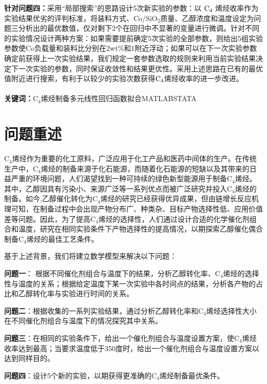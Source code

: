 \documentclass[a4paper,10.5pt]{ctexart}
\begin{document}
\par \textbf{针对问题四：}采用“局部搜索”的思路设计5次新实验的参数：以 ${\rm C}_4$ 烯烃收率作为实验结果优劣的评判标准，将装料方式、Co/SiO$_2$质量、乙醇浓度和温度设定为问题三分析出的最优数值，仅对剩下2个在回归中不显著的变量进行微调。针对不同的实验情况设计两种方案：如果需要提前确定5次实验的全部参数，则给出5组实验参数使Co负载量和装料比分别在2wt$\%$和1附近浮动；如果可以在下一次实验参数确定前获得上一次实验结果，我们规定一套参数选取的规则来利用当前实验结果决定下一次实验的参数，同时保证收敛性和结果更优性。采用上述思路在已有的最优值附近进行搜索，有利于以较少的实验次数获得${\rm C}_4$烯烃收率的进一步改进。\\
~\\
\textbf{关键词：}C$_4$烯烃制备\quad 多元线性回归\quad 函数拟合\quad MATLAB\quad STATA
\clearpage

\section{问题重述}
\par C$_4$烯烃作为重要的化工原料，广泛应用于化工产品和医药中间体的生产。在传统生产中，C$_4$烯烃的制备来源于化石能源，而随着化石能源的短缺以及其带来的日益严重的环境问题，人们渴望找到一种可持续的绿色新型能源用于制备C$_4$烯烃。其中，乙醇因具有污染小、来源广泛等一系列优点而被广泛研究并投入C$_4$烯烃的制备。如今,乙醇催化转化为C$_4$烯烃的研究已经获得优异成果，但由链增长反应机理可知，在制备过程中会出现产物分布广、种类杂、目标产物选择性低、应用价值差等问题。因此，为了提高C$_4$烯烃的选择性，人们通过设计合适的化学催化剂组合和温度，研究在相同实验条件下产物选择性的提高情况，以期探索乙醇催化偶合制备C$_4$烯烃的最佳工艺条件。\cite{article1}
\par 基于上述背景，我们将建立数学模型来解决以下问题：
\par \textbf{问题一}： 根据不同催化剂组合与温度下的结果，分析乙醇转化率、C$_4$烯烃的选择性与温度的关系；根据给定温度下某一次实验中各时间点的结果，分析各产物的占比和乙醇转化率与实验进行时间的关系。
\par \textbf{问题二}：根据收集的一系列实验结果，通过分析乙醇转化率和C$_4$烯烃选择性大小在不同催化剂组合与温度下的情况探究其中关系。
\par \textbf{问题三}：在相同的实验条件下，给出一个催化剂组合与温度设置方案，使C$_4$烯烃收率达到最高；当要求温度低于350度时，给出一个催化剂组合与温度设置方案以达到同样目的。
\par \textbf{问题四}：设计5个新的实验，以期获得更准确的C$_4$烯烃制备最优条件。
\end{document}
